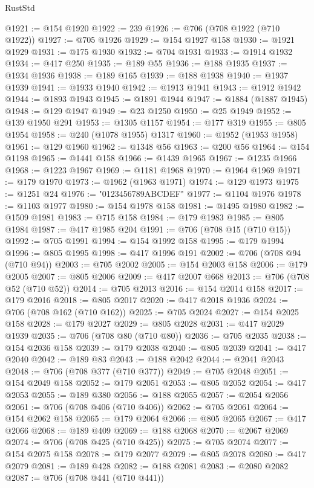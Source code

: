 \begin{lexlean}{RustStd}
\begin{coremodule}
{\begin{coremodule}
{{{{{{{{{{{{{{{{{{{{{{{{{{{{{{{{{{{{{{{@1921 := @154 @1920
@1922 := 239
@1926 := @706 (@708 @1922 (@710 @1922))
@1927 := @705 @1926
@1929 := @154 @1927 @158
@1930 := @1921 @1929
@1931 := @175 @1930
@1932 := @704 @1931
@1933 := @1914 @1932
@1934 := @417 @250
@1935 := @189 @55
@1936 := @188 @1935
@1937 := @1934 @1936
@1938 := @189 @165
@1939 := @188 @1938
@1940 := @1937 @1939
@1941 := @1933 @1940
@1942 := @1913 @1941
@1943 := @1912 @1942
@1944 := @1893 @1943
@1945 := @1891 @1944
@1947 := @1884 (@1887 @1945)
@1948 := @129 @1947
@1949 := @23 @1250
@1950 := @25 @1949
@1952 := @139 @1950 @291
@1953 := @1305 @1157
@1954 := @177 @319
@1955 := @805 @1954
@1958 := @240 (@1078 @1955) @1317
@1960 := @1952 (@1953 @1958)
@1961 := @129 @1960
@1962 := @1348 @56
@1963 := @200 @56
@1964 := @154 @1198
@1965 := @1441 @158
@1966 := @1439 @1965
@1967 := @1235 @1966
@1968 := @1223 @1967
@1969 := @1181 @1968
@1970 := @1964 @1969
@1971 := @179 @1970
@1973 := @1962 (@1963 @1971)
@1974 := @129 @1973
@1975 := @1251 @24
@1976 := "0123456789ABCDEF"
@1977 := @1104 @1976
@1978 := @1103 @1977
@1980 := @154 @1978 @158
@1981 := @1495 @1980
@1982 := @1509 @1981
@1983 := @715 @158
@1984 := @179 @1983
@1985 := @805 @1984
@1987 := @417 @1985 @204
@1991 := @706 (@708 @15 (@710 @15))
@1992 := @705 @1991
@1994 := @154 @1992 @158
@1995 := @179 @1994
@1996 := @805 @1995
@1998 := @417 @1996 @191
@2002 := @706 (@708 @94 (@710 @94))
@2003 := @705 @2002
@2005 := @154 @2003 @158
@2006 := @179 @2005
@2007 := @805 @2006
@2009 := @417 @2007 @668
@2013 := @706 (@708 @52 (@710 @52))
@2014 := @705 @2013
@2016 := @154 @2014 @158
@2017 := @179 @2016
@2018 := @805 @2017
@2020 := @417 @2018 @1936
@2024 := @706 (@708 @162 (@710 @162))
@2025 := @705 @2024
@2027 := @154 @2025 @158
@2028 := @179 @2027
@2029 := @805 @2028
@2031 := @417 @2029 @1939
@2035 := @706 (@708 @80 (@710 @80))
@2036 := @705 @2035
@2038 := @154 @2036 @158
@2039 := @179 @2038
@2040 := @805 @2039
@2041 := @417 @2040
@2042 := @189 @83
@2043 := @188 @2042
@2044 := @2041 @2043
@2048 := @706 (@708 @377 (@710 @377))
@2049 := @705 @2048
@2051 := @154 @2049 @158
@2052 := @179 @2051
@2053 := @805 @2052
@2054 := @417 @2053
@2055 := @189 @380
@2056 := @188 @2055
@2057 := @2054 @2056
@2061 := @706 (@708 @406 (@710 @406))
@2062 := @705 @2061
@2064 := @154 @2062 @158
@2065 := @179 @2064
@2066 := @805 @2065
@2067 := @417 @2066
@2068 := @189 @409
@2069 := @188 @2068
@2070 := @2067 @2069
@2074 := @706 (@708 @425 (@710 @425))
@2075 := @705 @2074
@2077 := @154 @2075 @158
@2078 := @179 @2077
@2079 := @805 @2078
@2080 := @417 @2079
@2081 := @189 @428
@2082 := @188 @2081
@2083 := @2080 @2082
@2087 := @706 (@708 @441 (@710 @441))
}}}}}}}}}}}}}}}}}}}}}}}}}}}}}}}}}}}}}}}
\end{coremodule}}
\end{coremodule}
\end{lexlean}
